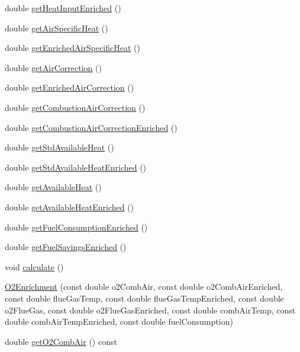 \begin{DoxyCompactItemize}
double \hyperlink{class_o2_enrichment_ac1d74fe5a8791b9a8bc596bcb19b8b1e}{get\+Heat\+Input\+Enriched} ()
\item 
double \hyperlink{class_o2_enrichment_a435552fca78d0648dddaf406e250e9b6}{get\+Air\+Specific\+Heat} ()
\item 
double \hyperlink{class_o2_enrichment_ac9fc3524b7243fbaac29884c1e6c5748}{get\+Enriched\+Air\+Specific\+Heat} ()
\item 
double \hyperlink{class_o2_enrichment_a95f854d807f2b33ca32c68707e627283}{get\+Air\+Correction} ()
\item 
double \hyperlink{class_o2_enrichment_a7e1eeaca64c46969c0652a46b67fad76}{get\+Enriched\+Air\+Correction} ()
\item 
double \hyperlink{class_o2_enrichment_a7ecca6a53529843246555ae33379d464}{get\+Combustion\+Air\+Correction} ()
\item 
double \hyperlink{class_o2_enrichment_aa8bbec67d760c83da77ce5b4ee01e41c}{get\+Combustion\+Air\+Correction\+Enriched} ()
\item 
double \hyperlink{class_o2_enrichment_a6eab50d08baaca010d208139cb99d239}{get\+Std\+Available\+Heat} ()
\item 
double \hyperlink{class_o2_enrichment_a24fd19f2aca20c7ba83061b832323ad6}{get\+Std\+Available\+Heat\+Enriched} ()
\item 
double \hyperlink{class_o2_enrichment_ac34e93c7e1444ab81a621428f0eee4d3}{get\+Available\+Heat} ()
\item 
double \hyperlink{class_o2_enrichment_afc7f9ea349f338ead76255218769a3e3}{get\+Available\+Heat\+Enriched} ()
\item 
double \hyperlink{class_o2_enrichment_aaf0dae071145b439e995d90f838878a7}{get\+Fuel\+Consumption\+Enriched} ()
\item 
double \hyperlink{class_o2_enrichment_a2aa9f8d3a02935931e705f82ae57c72f}{get\+Fuel\+Savings\+Enriched} ()
\item 
void \hyperlink{class_o2_enrichment_a91d7e18a336466cf9fbc0cae42dde282}{calculate} ()
\item 
\hyperlink{class_o2_enrichment_a8d60cf5ef65e8528a5a432c7cec75699}{O2\+Enrichment} (const double o2\+Comb\+Air, const double o2\+Comb\+Air\+Enriched, const double flue\+Gas\+Temp, const double flue\+Gas\+Temp\+Enriched, const double o2\+Flue\+Gas, const double o2\+Flue\+Gas\+Enriched, const double comb\+Air\+Temp, const double comb\+Air\+Temp\+Enriched, const double fuel\+Consumption)
\item 
double \hyperlink{class_o2_enrichment_a52953d4a55fd9e4d91030fe96d800f71}{get\+O2\+Comb\+Air} () const

\end{DoxyCompactItemize}
